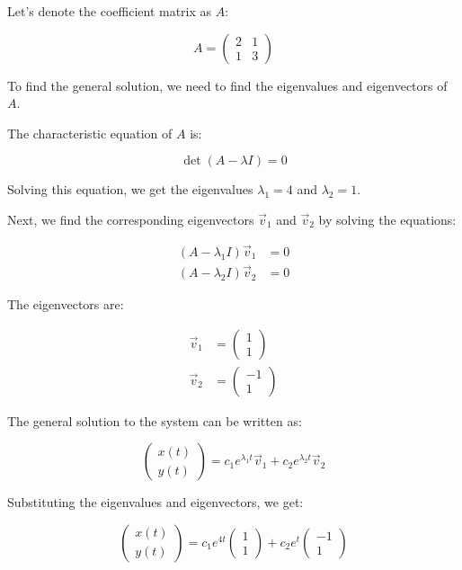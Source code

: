 \documentclass[a4paper,12pt]{article}
\begin{document}
Let's denote the coefficient matrix as $A$:

\begin{equation*}
A =
\begin{pmatrix}
2 & 1 \\
1 & 3
\end{pmatrix}
\end{equation*}

To find the general solution, we need to find the eigenvalues and eigenvectors of $A$.

The characteristic equation of $A$ is:

\begin{equation*}
\det(A - \lambda I) = 0
\end{equation*}

Solving this equation, we get the eigenvalues $\lambda_1 = 4$ and $\lambda_2 = 1$.

Next, we find the corresponding eigenvectors $\vec{v}_1$ and $\vec{v}_2$ by solving the equations:

\begin{align*}
(A - \lambda_1 I)\vec{v}_1 &= 0 \\
(A - \lambda_2 I)\vec{v}_2 &= 0
\end{align*}

The eigenvectors are:

\begin{align*}
\vec{v}_1 &= \begin{pmatrix} 1 \\ 1 \end{pmatrix} \\
\vec{v}_2 &= \begin{pmatrix} -1 \\ 1 \end{pmatrix}
\end{align*}

The general solution to the system can be written as:

\begin{equation*}
\begin{pmatrix}
x(t) \\
y(t)
\end{pmatrix}
= c_1 e^{\lambda_1 t} \vec{v}_1 + c_2 e^{\lambda_2 t} \vec{v}_2
\end{equation*}

Substituting the eigenvalues and eigenvectors, we get:

\begin{equation*}
\begin{pmatrix}
x(t) \\
y(t)
\end{pmatrix}
= c_1 e^{4t} \begin{pmatrix} 1 \\ 1 \end{pmatrix} + c_2 e^{t} \begin{pmatrix} -1 \\ 1 \end{pmatrix}
\end{equation*}
\end{document}

